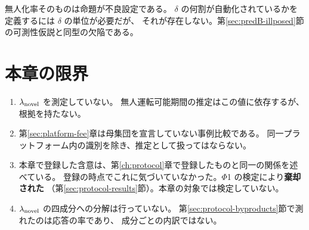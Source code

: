 無人化率そのものは命題が不良設定である。
$\delta$ の何割が自動化されているかを定義するには $\delta$ の単位が必要だが、
それが存在しない。第\ref{sec:predB-illposed}節の可測性仮説と同型の欠陥である。

\section{本章の限界}

\begin{enumerate}[label=(\arabic*)]
\item $\lambda_{\rm novel}$ を測定していない。
無人運転可能期間の推定はこの値に依存するが、根拠を持たない。

\item 第\ref{sec:platform-fee}章は母集団を宣言していない事例比較である。
同一プラットフォーム内の識別を除き、推定として扱ってはならない。

\item 本章で登録した含意は、第\ref{ch:protocol}章で登録したものと同一の関係を述べている。
登録の時点でこれに気づいていなかった。$\Phi$1 の検定により\textbf{棄却された}
（第\ref{sec:protocol-results}節）。本章の対象では検定していない。

\item $\lambda_{\rm novel}$ の四成分への分解は行っていない。
第\ref{sec:protocol-byproducts}節で測れたのは応答の率であり、
成分ごとの内訳ではない。
\end{enumerate}

